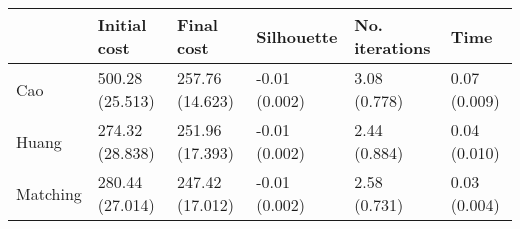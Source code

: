 \begin{tabular}{llllll}
\toprule
{} &     Initial cost &       Final cost &     Silhouette & No. iterations &          Time \\
\midrule
Cao      &  500.28 (25.513) &  257.76 (14.623) &  -0.01 (0.002) &   3.08 (0.778) &  0.07 (0.009) \\
Huang    &  274.32 (28.838) &  251.96 (17.393) &  -0.01 (0.002) &   2.44 (0.884) &  0.04 (0.010) \\
Matching &  280.44 (27.014) &  247.42 (17.012) &  -0.01 (0.002) &   2.58 (0.731) &  0.03 (0.004) \\
\bottomrule
\end{tabular}
